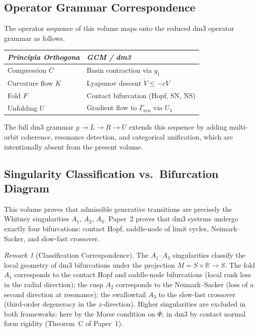 \documentclass[12pt, oneside]{book}
\theoremstyle{plain}
\theoremstyle{definition}
\theoremstyle{remark}
\newtheorem{remark}{Remark}[section]
\begin{document}
\subsection{Operator Grammar Correspondence}

The operator sequence of this volume maps onto the reduced dm3
operator grammar as follows.

\begin{center}
\begin{tabular}{ll}
\toprule
\emph{Principia Orthogona} & \emph{GCM / dm3} \\
\midrule
Compression $C$ & Basin contraction via $g_1$ \\
Curvature flow $K$ & Lyapunov descent $\dot{V} \le -cV$ \\
Fold $F$ & Contact bifurcation (Hopf, SN, NS) \\
Unfolding $U$ & Gradient flow to $\Gamma_{\mathrm{syn}}$ via $U_3$ \\
\bottomrule
\end{tabular}
\end{center}

The full dm3 grammar $g \to L \to R \to U$ extends this sequence
by adding multi-orbit coherence, resonance detection, and categorical
unification, which are intentionally absent from the present volume.

\subsection{Singularity Classification vs.\ Bifurcation Diagram}

This volume proves that admissible generative transitions are
precisely the Whitney singularities $A_1$, $A_2$, $A_3$.
Paper~2 proves that dm3 systems undergo exactly four bifurcations:
contact Hopf, saddle-node of limit cycles, Neimark--Sacker, and
slow-fast crossover.

\begin{remark}[Classification Correspondence]
The $A_1$--$A_3$ singularities classify the local geometry of dm3
bifurcations under the projection $M = S \times \mathbb{R} \to S$.
The fold $A_1$ corresponds to the contact Hopf and saddle-node
bifurcations (local rank loss in the radial direction); the cusp
$A_2$ corresponds to the Neimark--Sacker (loss of a second
direction at resonance); the swallowtail $A_3$ to the slow-fast
crossover (third-order degeneracy in the $z$-direction). Higher
singularities are excluded in both frameworks: here by the Morse
condition on $\Phi$; in dm3 by contact normal form rigidity
(Theorem~C of Paper~1).
\end{remark}
\end{document}

